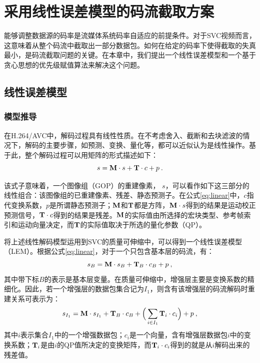 \chapter{采用线性误差模型的码流截取方案}

能够调整数据源的码率是流媒体系统码率自适应的前提条件。对于SVC视频而言，这意味着从整个码流中截取出一部分数据包。如何在给定的码率下使得截取的失真最小，是码流截取问题的关键。在本章中，我们提出一个线性误差模型和一个基于贪心思想的优先级赋值算法来解决这个问题。

\section{线性误差模型}

\subsection{模型推导}

在H.264/AVC中，解码过程具有线性性质\supercite{Winken2008}。在不考虑舍入、截断和去块滤波的情况下，解码的主要步骤，如预测、变换、量化等，都可以近似认为是线性操作。基于此，整个解码过程可以用矩阵的形式描述如下：
\begin{equation}
\label{eq:linear}
s = {\rm\bf M} \cdot s + {\rm\bf T} \cdot c + p \: .
\end{equation}

该式子意味着，一个图像组（GOP）的重建像素， $s$，可以看作如下这三部分的线性组合：该图像组的已重建像素、残差、静态预测子。在公式\ref{eq:linear}中，$c$指代变换系数，$p$是所谓静态预测子；$\rm\bf M$和$\rm\bf T$都是方阵，${\rm\bf M} \cdot s$得到的结果是运动校正预测信号，${\rm\bf T} \cdot c$得到的结果是残差。$\rm\bf M$的实际值由所选择的宏块类型、参考帧索引和运动向量决定，而$\rm\bf T$的实际值取决于所选的量化参数（QP）。

将上述线性解码模型运用到SVC的质量可伸缩中，可以得到一个线性误差模型（LEM）。根据公式\ref{eq:linear}，对于一个只包含基本层的码流，有：
\begin{equation}
\label{eq:base0}
s_{B} = {\rm\bf M} \cdot s_{B} + {\rm\bf T}_{B} \cdot c_{B} + p \: ,
\end{equation}
其中带下标$B$的表示是基本层变量。在质量可伸缩中，增强层主要是变换系数的精细化。因此，若一个增强层的数据包集合记为$I_1$，则含有该增强层的码流解码时重建关系可表示为：
\begin{equation}
\label{eq:subset1}
s_{I_1} = {\rm\bf M} \cdot s_{I_1} + {\rm\bf T}_{B} \cdot c_{B} + \Big( \sum_{i \in I_1}{\rm\bf T}_i \cdot c_i \Big) + p \: ,
\end{equation}
其中$i$表示集合$I_1$中的一个增强数据包；$c_i$是一个向量，含有增强层数据包$i$中的变换系数；${\rm\bf T}_i$是由$i$的QP值所决定的变换矩阵，而${\rm\bf T}_i \cdot c_i$得到的就是从$i$解码出来的残差值。

